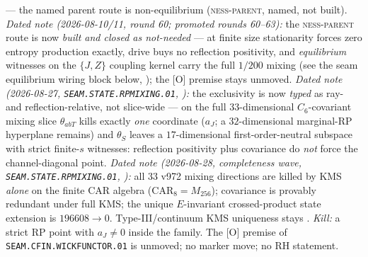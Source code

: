 {--- the named parent route is non-equilibrium
(\textsc{ness-parent}, named, not built).  \emph{Dated note
(2026-08-10/11, round 60; promoted rounds 60--63):} the
\textsc{ness-parent} route is now \emph{built and closed as
not-needed} --- at finite size stationarity forces zero entropy
production exactly, drive buys no reflection positivity, and
\emph{equilibrium} witnesses on the $\{J, Z\}$ coupling kernel
carry the full $1/200$ mixing (see the seam equilibrium wiring
block below, ); the [O]
premise stays unmoved.  \emph{Dated note (2026-08-27,
\texttt{SEAM.STATE.RPMIXING.01},
):} the exclusivity is
now \emph{typed} as ray- and reflection-relative, not
slice-wide --- on the full $33$-dimensional $C_6$-covariant
mixing slice $\theta_{abT}$ kills exactly \emph{one} coordinate
($a_J$; a $32$-dimensional marginal-RP hyperplane remains) and
$\theta_S$ leaves a $17$-dimensional first-order-neutral
subspace with strict finite-$s$ witnesses: reflection
positivity plus covariance do \emph{not} force the
channel-diagonal point.  \emph{Dated note (2026-08-28,
completeness wave, \texttt{SEAM.STATE.RPMIXING.01},
):} all $33$ v972 mixing
directions are killed by KMS \emph{alone} on the finite CAR algebra
($\mathrm{CAR}_8=M_{256}$); covariance is provably redundant under
full KMS; the unique $E$-invariant crossed-product state extension
is $196608\to 0$.  Type-III/continuum KMS uniqueness stays \mO.
\emph{Kill:} a strict
RP point with $a_J \ne 0$ inside the family.  The [O] premise of
\texttt{SEAM.CFIN.WICKFUNCTOR.01} is unmoved; no marker move; no
RH statement.\par}

